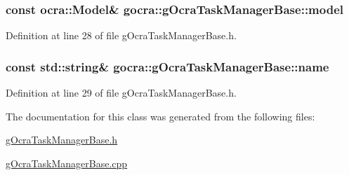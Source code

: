 \subsubsection[{\texorpdfstring{model}{model}}]{\setlength{\rightskip}{0pt plus 5cm}const {\bf ocra\+::\+Model}\& gocra\+::g\+Ocra\+Task\+Manager\+Base\+::model\hspace{0.3cm}{\ttfamily [protected]}}\hypertarget{classgocra_1_1gOcraTaskManagerBase_adc439e7170f7120611fc6d009d06404e}{}\label{classgocra_1_1gOcraTaskManagerBase_adc439e7170f7120611fc6d009d06404e}


Definition at line 28 of file g\+Ocra\+Task\+Manager\+Base.\+h.

\subsubsection[{\texorpdfstring{name}{name}}]{\setlength{\rightskip}{0pt plus 5cm}const std\+::string\& gocra\+::g\+Ocra\+Task\+Manager\+Base\+::name\hspace{0.3cm}{\ttfamily [protected]}}\hypertarget{classgocra_1_1gOcraTaskManagerBase_adfda0d31ecfa9afea1380f076a472f37}{}\label{classgocra_1_1gOcraTaskManagerBase_adfda0d31ecfa9afea1380f076a472f37}


Definition at line 29 of file g\+Ocra\+Task\+Manager\+Base.\+h.



The documentation for this class was generated from the following files\+:\begin{DoxyCompactItemize}
\item 
\hyperlink{gOcraTaskManagerBase_8h}{g\+Ocra\+Task\+Manager\+Base.\+h}\item 
\hyperlink{gOcraTaskManagerBase_8cpp}{g\+Ocra\+Task\+Manager\+Base.\+cpp}\end{DoxyCompactItemize}
